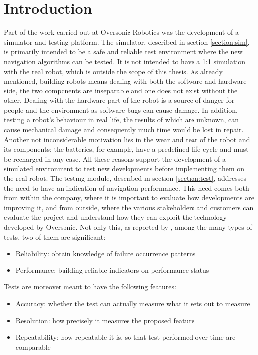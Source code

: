 \section{Introduction}
Part of the work carried out at Oversonic Robotics was the development of a simulator and testing platform.
The simulator, described in section \ref{section:sim}, is primarily intended to be a safe and reliable test environment where the new navigation algorithms can be tested. It is not intended to have a 1:1 simulation with the real robot, which is outside the scope of this thesis. 
As already mentioned, building robots means dealing with both the software and hardware side, the two components are inseparable and one does not exist without the other.
Dealing with the hardware part of the robot is a source of danger for people and the environment as software bugs can cause damage. In addition, testing a robot's behaviour in real life, the results of which are unknown, can cause mechanical damage and consequently much time would be lost in repair. Another not inconsiderable motivation lies in the wear and tear of the robot and its components: the batteries, for example, have a predefined life cycle and must be recharged in any case.
All these reasons support the development of a simulated environment to test new developments before implementing them on the real robot.
The testing module, described in section \ref{section:test}, addresses the need to have an indication of navigation performance. This need comes both from within the company, where it is important to evaluate how developments are improving it, and from outside, where the various stakeholders and customers can evaluate the project and understand how they can exploit the technology developed by Oversonic.
Not only this, as reported by \citet{Dhillon1991}, among the many types of tests, two of them are significant:
\begin{itemize}
    \item Reliability: obtain knowledge of failure occurrence patterns
    \item Performance: building reliable indicators on performance status
\end{itemize}
Tests are  moreover meant to have the following features:
\begin{itemize}
    \item Accuracy: whether the test can actually measure what it sets out to measure
    \item Resolution: how precisely it measures the proposed feature
    \item Repeatability: how repeatable it is, so that test performed over time are comparable 
\end{itemize}

